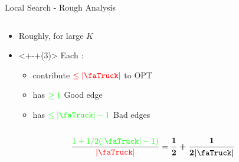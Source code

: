 \begin{frame}{Local Search - Rough Analysis}
\begin{columns}
\begin{column}{.6\textwidth}

\begin{itemize}[<+>]
	\item Roughly, for large $K$
	\item<+-+(3)> Each {\color{red}\faStar}:
	\begin{itemize}
	  \item contribute $\color{red} \leq |\text{\faTruck}|$ to OPT
	  \item has $\color{green} \geq 1$ Good edge
	  \item has $\color{green} \leq |\text{\faTruck}| - 1$ Bad edges
	\end{itemize}
\end{itemize}
\end{column}
\begin{column}{.5\textwidth}

\end{column}
\end{columns}

\onslide<+>
\vfill
$$
\frac{\color{green} 1 + 1/2 (|\text{\faTruck}| - 1)}{\color{red} |\text{\faTruck}|} 
=
\bm{\frac{1}{2} + \frac{1}{2 |\text{\faTruck}|}}
$$
\end{frame}